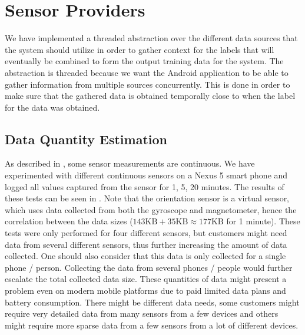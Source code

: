 
\section{Sensor Providers}
\label{sec:sensor_providers}

We have implemented a threaded abstraction over the different data sources that the system should utilize in order to gather context for the labels that will eventually be combined to form the output training data for the system. The abstraction is threaded because we want the Android application to be able to gather information from multiple sources concurrently. This is done in order to make sure that the gathered data is obtained temporally close to when the label for the data was obtained. 

\subsection{Data Quantity Estimation}
\label{sub:data_quantity_estimation}

As described in , some sensor measurements are continuous. We have experimented with different continuous sensors on a Nexus 5 smart phone and logged all values captured from the sensor for 1, 5, 20 minutes. The results of these tests can be seen in . Note that the orientation sensor is a virtual sensor, which uses data collected from both the gyroscope and magnetometer, hence the correlation between the data sizes ($143 \text{KB} + 35 \text{KB} \approx 177 \text{KB}$ for 1 minute). These tests were only performed for four different sensors, but customers might need data from several different sensors, thus further increasing the amount of data collected. One should also consider that this data is only collected for a single phone / person. Collecting the data from several phones / people would further escalate the total collected data size. These quantities of data might present a problem even on modern mobile platforms due to paid limited data plans and battery consumption. There might be different data needs, some customers might require very detailed data from many sensors from a few devices and others might require more sparse data from a few sensors from a lot of different devices. 

